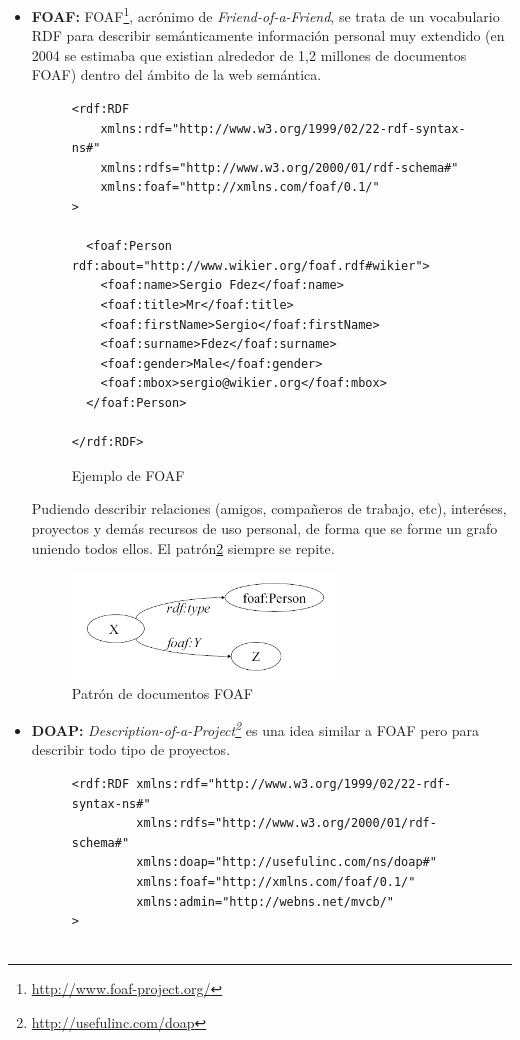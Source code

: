 \begin{itemize}
  \item \textbf{FOAF:} FOAF\footnote{\url{http://www.foaf-project.org/}}, acrónimo de 
	\emph{Friend-of-a-Friend}, se trata de un vocabulario RDF para describir 
	semánticamente información personal muy extendido (en 2004 se estimaba\cite{Li2005} 
	que existian alrededor de 1,2 millones de documentos FOAF) dentro del ámbito 
	de la web semántica.

\begin{figure} [H]
\lstset{language=RDF}
\begin{lstlisting}
<rdf:RDF
	xmlns:rdf="http://www.w3.org/1999/02/22-rdf-syntax-ns#"
	xmlns:rdfs="http://www.w3.org/2000/01/rdf-schema#"
	xmlns:foaf="http://xmlns.com/foaf/0.1/"
>

  <foaf:Person rdf:about="http://www.wikier.org/foaf.rdf#wikier">
    <foaf:name>Sergio Fdez</foaf:name>
    <foaf:title>Mr</foaf:title>
    <foaf:firstName>Sergio</foaf:firstName>
    <foaf:surname>Fdez</foaf:surname>
    <foaf:gender>Male</foaf:gender>
    <foaf:mbox>sergio@wikier.org</foaf:mbox>
  </foaf:Person>

</rdf:RDF>
\end{lstlisting}
\caption{Ejemplo de FOAF}
\label{fig:ejemplo.foaf}
\end{figure}

	Pudiendo describir relaciones (amigos, compañeros de trabajo, etc), interéses,
	proyectos y demás recursos de uso personal, de forma que se forme un grafo 
	uniendo todos ellos. El patrón\ref{fig:patternFOAF} siempre se repite.

	\begin{figure}[H]
		\centering
		\includegraphics[width=7cm]{images/patron-foaf.png}
		\caption{Patrón de documentos FOAF}
		\label{fig:patternFOAF}
	\end{figure}

  \item \textbf{DOAP:} \emph{Description-of-a-Project\footnote{\url{http://usefulinc.com/doap}}} 
	es una idea similar a FOAF pero para describir todo tipo de proyectos.

\begin{figure}[H]
\lstset{language=RDF}
\begin{lstlisting}
<rdf:RDF xmlns:rdf="http://www.w3.org/1999/02/22-rdf-syntax-ns#" 
         xmlns:rdfs="http://www.w3.org/2000/01/rdf-schema#" 
         xmlns:doap="http://usefulinc.com/ns/doap#" 
         xmlns:foaf="http://xmlns.com/foaf/0.1/" 
         xmlns:admin="http://webns.net/mvcb/" 
>


\end{lstlisting}
\end{figure}
\end{itemize}
